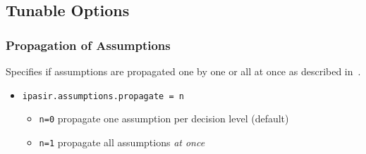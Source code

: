 \documentclass[sat]{iosart2x}
\begin{document}
\subsection{Tunable Options}

\subsubsection{Propagation of Assumptions}
Specifies if assumptions are propagated one by one or all at once as described in~\cite{Hickey:2019:Assumps}.

\begin{itemize}
    \item \texttt{ipasir.assumptions.propagate = n}
    \begin{itemize}
        \item \texttt{n=0} propagate one assumption per decision level (default)
        \item \texttt{n=1} propagate all assumptions \textit{at once}
    \end{itemize}
\end{itemize}






\end{document}
